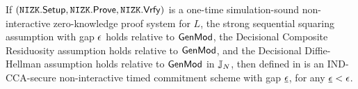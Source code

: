 %
%



\begin{theorem}
If  $(\mathtt{NIZK}.\mathsf{Setup}, \mathtt{NIZK}.\mathsf{Prove}, \mathtt{NIZK}.\mathsf{Vrfy})$ is a one-time simulation-sound non-interactive zero-knowledge proof system for $L$, the strong sequential squaring assumption with gap $\epsilon$ holds relative to $\mathsf{GenMod}$, the Decisional Composite Residuosity assumption holds relative to $\mathsf{GenMod}$, and the Decisional Diffie-Hellman assumption holds relative to $\mathsf{GenMod}$ in $\mathbb{J}_N$, then \mathlist{(\pgen, \com, \cvrfy, \dvrfy, \fdecom)} defined in  is an IND-CCA-secure non-interactive timed commitment scheme with gap $\underline{\epsilon}$, for any $\underline{\epsilon} < \epsilon$. 
\end{theorem}

